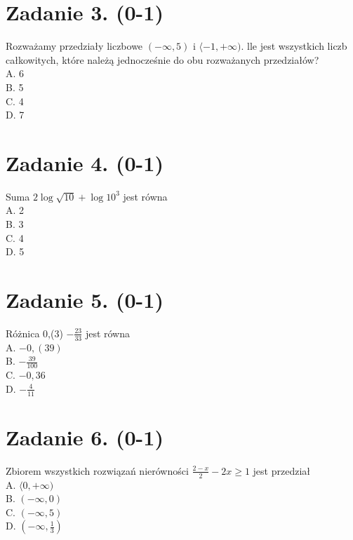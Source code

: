 \documentclass[10pt]{article}
\begin{document}
\section*{Zadanie 3. (0-1)}
Rozważamy przedziały liczbowe \((-\infty, 5)\) i \(\langle-1,+\infty)\). lle jest wszystkich liczb całkowitych, które należą jednocześnie do obu rozważanych przedziałów?\\
A. 6\\
B. 5\\
C. 4\\
D. 7

\section*{Zadanie 4. (0-1)}
Suma \(2 \log \sqrt{10}+\log 10^{3}\) jest równa\\
A. 2\\
B. 3\\
C. 4\\
D. 5

\section*{Zadanie 5. (0-1)}
Różnica 0,(3) \(-\frac{23}{33}\) jest równa\\
A. \(-0,(39)\)\\
B. \(-\frac{39}{100}\)\\
C. \(-0,36\)\\
D. \(-\frac{4}{11}\)

\section*{Zadanie 6. (0-1)}
Zbiorem wszystkich rozwiązań nierówności \(\frac{2-x}{2}-2 x \geq 1\) jest przedział\\
A. \(\langle 0,+\infty)\)\\
B. \((-\infty, 0)\)\\
C. \((-\infty, 5)\)\\
D. \(\left(-\infty, \frac{1}{3}\right)\)
\end{document}
